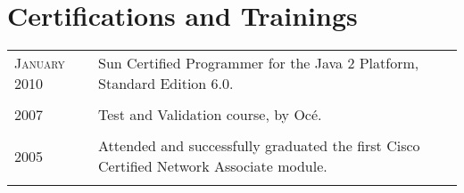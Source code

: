 \documentclass[a4paper,10pt]{article}
\begin{document}
\section{Certifications and Trainings}
\begin{tabular}{p{2.5cm}|p{11cm}}
\raggedleft \textsc{January 2010} & Sun Certified Programmer for the Java 2
Platform, Standard Edition 6.0. 
\\
\multicolumn{2}{c}{}
\\
 \raggedleft \textsc{2007} & Test and Validation course, by Oc\'e.\\
\multicolumn{2}{c}{} 
\\ 
\raggedleft  \textsc{2005} & Attended and successfully
graduated the first Cisco Certified Network Associate module.\\ \multicolumn{2}{c}{} \\
\end{tabular}

\end{document}
